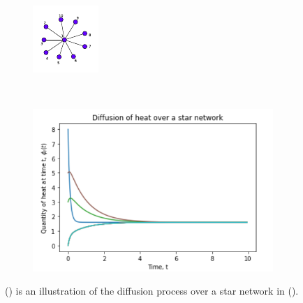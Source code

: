 \documentclass[10pt,a4paper]{article}
\begin{document}
\begin{figure}[!h]
	\centering
	\begin{subfigure}[b]{0.27\textwidth}
		\includegraphics[width=\textwidth]{images/star-difusion.pdf}
		\caption{}
		\label{stardifn-graph}
	\end{subfigure}~
	\begin{subfigure}[b]{0.45\textwidth}
		\includegraphics[width= \textwidth]{images/star-quantity-time.png}
		\caption{}
		\label{stardifn-plot}
	\end{subfigure}
	\caption{() is an illustration of the diffusion process over a star network in (). }
	\label{stargraph-plot}
\end{figure}
\end{document}
